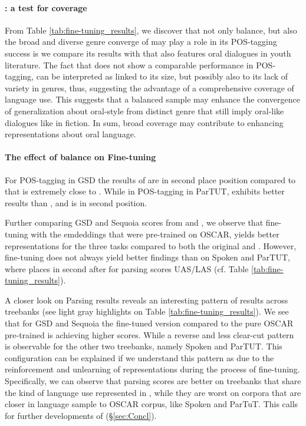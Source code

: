 \paragraph{\ELMococa : a test for coverage}
From Table \ref{tab:fine-tuning_results}, we discover that not only balance, but also the broad and diverse genre converge of \Cabernet may play a role in its POS-tagging success is we compare its results with \ELMocbt that also features oral dialogues in youth literature. The fact that \ELMocbt does not show a comparable performance in POS-tagging, can be interpreted as linked to its size, but possibly also to its lack of variety in genres, thus, suggesting the advantage of a comprehensive coverage of language use. This suggests that a balanced sample may enhance the convergence of generalization about oral-style from distinct genre that still imply oral-like dialogues like in fiction. In sum, broad coverage may contribute to enhancing representations about oral language.

\paragraph{The effect of balance on Fine-tuning}
For POS-tagging in GSD the results of \ELMooscar are in second place position compared to \ELMocoscar that is extremely close to \ELMowiki. While in POS-tagging in ParTUT, \ELMowiki exhibits better results than \ELMooscar, and \ELMocoscar is in second position.

Further comparing GSD and Sequoia scores from \ELMooscar and \ELMocoscar, we observe that fine-tuning with \Cabernet the emdeddings that were pre-trained on OSCAR, yields better representations for the three tasks compared to both the original \ELMooscar and \ELMococa.
However, fine-tuning does not always yield better findings than \ELMooscar on Spoken and ParTUT, where \ELMocoscar places in second after \ELMooscar for parsing scores UAS/LAS (cf. Table \ref{tab:fine-tuning_results}).

A closer look on Parsing results reveals an interesting pattern of results across treebanks (see light gray highlights on Table \ref{tab:fine-tuning_results}). We see that for GSD and Sequoia the \Cabernet fine-tuned version \ELMocoscar compared to the pure OSCAR pre-trained \ELMooscar is achieving higher scores. While a reverse and less clear-cut pattern is observable for the other two treebanks, namely Spoken and ParTUT. This configuration can be explained if we understand this pattern as due to the reinforcement and unlearning of \ELMooscar representations during the process of fine-tuning. Specifically, we can observe that parsing scores are better on treebanks that share the kind of language use represented in \Cabernet, while they are worst on corpora that are closer in language sample to OSCAR corpus, like Spoken and ParTuT. This calls for further developments of \Cabernet (§\ref{sec:Concl}).

